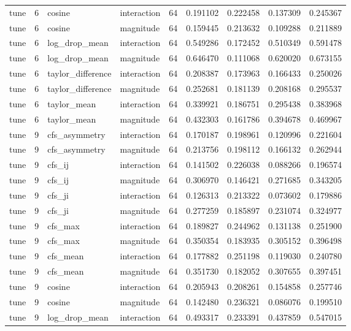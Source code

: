 \begin{tabular}{lrllrrrrr}
tune & 6 & cosine & interaction & 64 & 0.191102 & 0.222458 & 0.137309 & 0.245367 \\
tune & 6 & cosine & magnitude & 64 & 0.159445 & 0.213632 & 0.109288 & 0.211889 \\
tune & 6 & log_drop_mean & interaction & 64 & 0.549286 & 0.172452 & 0.510349 & 0.591478 \\
tune & 6 & log_drop_mean & magnitude & 64 & 0.646470 & 0.111068 & 0.620020 & 0.673155 \\
tune & 6 & taylor_difference & interaction & 64 & 0.208387 & 0.173963 & 0.166433 & 0.250026 \\
tune & 6 & taylor_difference & magnitude & 64 & 0.252681 & 0.181139 & 0.208168 & 0.295537 \\
tune & 6 & taylor_mean & interaction & 64 & 0.339921 & 0.186751 & 0.295438 & 0.383968 \\
tune & 6 & taylor_mean & magnitude & 64 & 0.432303 & 0.161786 & 0.394678 & 0.469967 \\
tune & 9 & cfs_asymmetry & interaction & 64 & 0.170187 & 0.198961 & 0.120996 & 0.221604 \\
tune & 9 & cfs_asymmetry & magnitude & 64 & 0.213756 & 0.198112 & 0.166132 & 0.262944 \\
tune & 9 & cfs_ij & interaction & 64 & 0.141502 & 0.226038 & 0.088266 & 0.196574 \\
tune & 9 & cfs_ij & magnitude & 64 & 0.306970 & 0.146421 & 0.271685 & 0.343205 \\
tune & 9 & cfs_ji & interaction & 64 & 0.126313 & 0.213322 & 0.073602 & 0.179886 \\
tune & 9 & cfs_ji & magnitude & 64 & 0.277259 & 0.185897 & 0.231074 & 0.324977 \\
tune & 9 & cfs_max & interaction & 64 & 0.189827 & 0.244962 & 0.131138 & 0.251900 \\
tune & 9 & cfs_max & magnitude & 64 & 0.350354 & 0.183935 & 0.305152 & 0.396498 \\
tune & 9 & cfs_mean & interaction & 64 & 0.177882 & 0.251198 & 0.119030 & 0.240780 \\
tune & 9 & cfs_mean & magnitude & 64 & 0.351730 & 0.182052 & 0.307655 & 0.397451 \\
tune & 9 & cosine & interaction & 64 & 0.205943 & 0.208261 & 0.154858 & 0.257746 \\
tune & 9 & cosine & magnitude & 64 & 0.142480 & 0.236321 & 0.086076 & 0.199510 \\
tune & 9 & log_drop_mean & interaction & 64 & 0.493317 & 0.233391 & 0.437859 & 0.547015 \\

\end{tabular}
